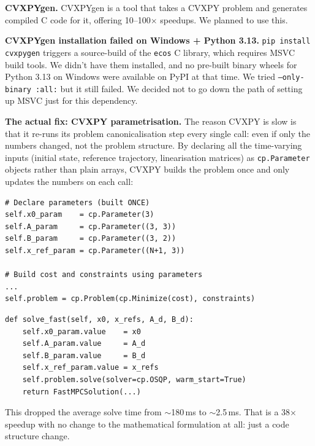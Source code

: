 \documentclass[12pt,a4paper]{article}
\begin{document}
\medskip
\noindent\textbf{CVXPYgen.} CVXPYgen is a tool that takes a CVXPY problem
and generates compiled C code for it, offering 10--100$\times$ speedups.
We planned to use this.

\begin{failbox}
\textbf{CVXPYgen installation failed on Windows + Python 3.13.}
\texttt{pip install cvxpygen} triggers a source-build of the \texttt{ecos}
C library, which requires MSVC build tools. We didn't have them installed,
and no pre-built binary wheels for Python 3.13 on Windows were available
on PyPI at that time. We tried \texttt{--only-binary :all:} but it still
failed. We decided not to go down the path of setting up MSVC just for
this dependency.
\end{failbox}

\textbf{The actual fix: CVXPY parametrisation.} The reason CVXPY is slow
is that it re-runs its problem canonicalisation step every single call:
even if only the numbers changed, not the problem structure. By declaring
all the time-varying inputs (initial state, reference trajectory,
linearisation matrices) as \texttt{cp.Parameter} objects rather than
plain arrays, CVXPY builds the problem once and only updates the numbers
on each call:

\begin{lstlisting}[caption={Parametrised MPC problem built once in \texttt{CVXPYgenWrapper.\_\_init\_\_()}}]
# Declare parameters (built ONCE)
self.x0_param    = cp.Parameter(3)
self.A_param     = cp.Parameter((3, 3))
self.B_param     = cp.Parameter((3, 2))
self.x_ref_param = cp.Parameter((N+1, 3))

# Build cost and constraints using parameters
...
self.problem = cp.Problem(cp.Minimize(cost), constraints)
\end{lstlisting}

\begin{lstlisting}[caption={Each control-loop call only updates values and re-solves}]
def solve_fast(self, x0, x_refs, A_d, B_d):
    self.x0_param.value    = x0
    self.A_param.value     = A_d
    self.B_param.value     = B_d
    self.x_ref_param.value = x_refs
    self.problem.solve(solver=cp.OSQP, warm_start=True)
    return FastMPCSolution(...)
\end{lstlisting}

This dropped the average solve time from $\sim$180\,ms to $\sim$2.5\,ms.
That is a 38$\times$ speedup with no change to the mathematical formulation
at all: just a code structure change.
\end{document}
